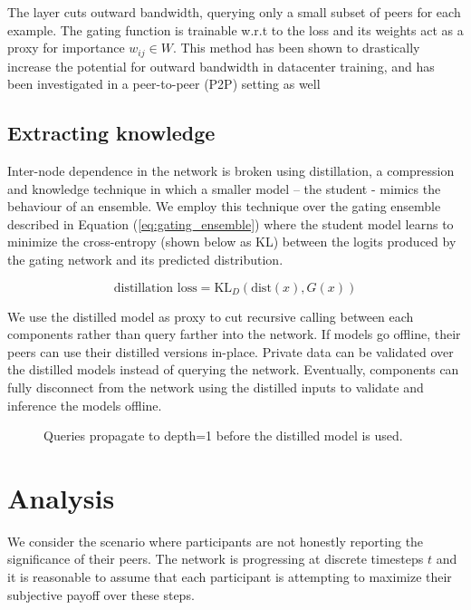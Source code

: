 \documentclass{article}
\begin{document}
The layer cuts outward bandwidth, querying only a small subset of peers for each example. The gating function is trainable w.r.t to the loss and its weights act as a proxy for importance $w_{ij} \in W$. This method has been shown to drastically increase the potential for outward bandwidth in datacenter training,\cite{shazeer2017outrageously} and has been investigated in a peer-to-peer (P2P) setting as well \cite{Riabinin2020learningathome}


\subsection{Extracting knowledge}

Inter-node dependence in the network is broken using distillation\cite{hinton2015distilling}, a compression and knowledge technique in which a smaller model -- the student - mimics the behaviour of an ensemble. We employ this technique over the gating ensemble described in Equation (\ref{eq:gating_ensemble}) where the student model learns to minimize the cross-entropy (shown below as KL) between the logits produced by the gating network and its predicted distribution. \cite{Sanh2019DistilBERT}

\begin{equation}
\textrm{distillation loss} = \text{KL}_D(\text{dist}(x), G(x)) 
\end{equation}

We use the distilled model as proxy to cut recursive calling between each components rather than query farther into the network. If models go offline, their peers can use their distilled versions in-place. Private data can be validated over the distilled models instead of querying the network. Eventually, components can fully disconnect from the network using the distilled inputs to validate and inference the models offline.

\begin{figure}[H]
	\centering
	\hspace*{0cm}
	
	\caption{Queries propagate to depth=1 before the distilled model is used.}
\end{figure}{}

\section{Analysis}
\label{analysis}

We consider the scenario where participants are not honestly reporting the significance of their peers. The network is progressing at discrete timesteps $t$ and it is reasonable to assume that each participant is attempting to maximize their subjective payoff over these steps.
\end{document}
